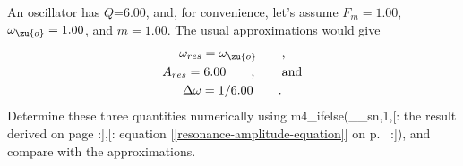         An oscillator has $Q$=6.00, and, for convenience, let's assume $F_m=1.00$, $\omega_\zu{o}=1.00$,
        and $m=1.00$. The usual approximations would give
        \begin{gather*}
                \omega_{res} =\omega_\zu{o} \qquad ,\\
                A_{res}=6.00 \qquad , \qquad \text{and}\\
                \Delta\omega=1/6.00 \qquad .
        \end{gather*}
        Determine these three quantities numerically using 
        m4_ifelse(__sn,1,[:%
        the result derived on page \pageref{misc:steadystate}
        :],[:%
        equation [\ref{resonance-amplitude-equation}] on p.~\pageref{resonance-amplitude-equation}
        :]), and
        compare with the approximations.

